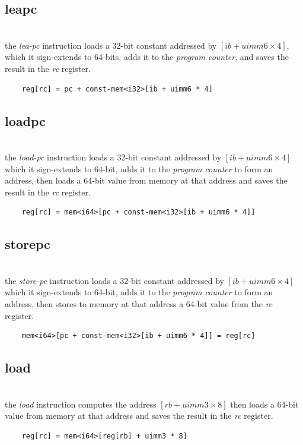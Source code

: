 \subsection{leapc}
\\
the \emph{lea-pc} instruction loads a 32-bit constant addressed by
\emph{$[ib + uimm6 \times 4]$}, which it sign-extends to 64-bits, adds it to
the \emph{program counter}, and saves the result in the \emph{rc} register.
\begin{Verbatim}
    reg[rc] = pc + const-mem<i32>[ib + uimm6 * 4]
\end{Verbatim}

\subsection{loadpc}
\\
the \emph{load-pc} instruction loads a 32-bit constant addressed by
\emph{$[ib + uimm6 \times 4]$} which it sign-extends to 64-bit, adds it to
the \emph{program counter} to form an address, then loads a 64-bit value
from memory at that address and saves the result in the \emph{rc} register.
\begin{Verbatim}
    reg[rc] = mem<i64>[pc + const-mem<i32>[ib + uimm6 * 4]]
\end{Verbatim}

\subsection{storepc}
\\
the \emph{store-pc} instruction loads a 32-bit constant addressed by
\emph{$[ib + uimm6 \times 4]$} which it sign-extends to 64-bit, adds it to the
\emph{program counter} to form an address, then stores to memory at that
address a 64-bit value from the \emph{rc} register.
\begin{Verbatim}
    mem<i64>[pc + const-mem<i32>[ib + uimm6 * 4]] = reg[rc]
\end{Verbatim}

\subsection{load}
\\
the \emph{load} instruction computes the address \emph{$[rb + uimm3 \times 8]$}
then loads a 64-bit value from memory at that address and saves the result in
the \emph{rc} register.
\begin{Verbatim}
    reg[rc] = mem<i64>[reg[rb] + uimm3 * 8]
\end{Verbatim}

